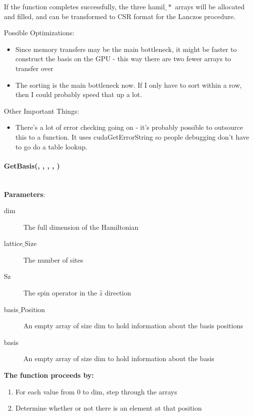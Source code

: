 \documentclass{article}
\begin{document}
{If the function completes successfully, the three hamil$\_*$ arrays will be allocated and filled, and can be transformed to CSR format for the Lanczos procedure.
 
Possible Optimizations:
\begin{itemize}
\item{Since memory transfers may be the main bottleneck, it might be faster to construct the basis on the GPU - this way there are two fewer arrays to transfer over}
\item{The sorting is the main bottleneck now. If I only have to sort within a row, then I could probably speed that up a lot.}
\end{itemize}

Other Important Things:
\begin{itemize}
\item{ There's a lot of error checking going on - it's probably possible to outsource this to a function. It uses cudaGetErrorString so people debugging don't have to go do a table lookup.}
\end{itemize} 

\paragraph{\host \void GetBasis(\int , \int , \int , \long [], \long []) \\ \\}
\noindent\textbf{Parameters}:
\begin{description}
\item[\long dim] The full dimension of the Hamiltonian
\item[\int lattice$\_$Size] The number of sites
\item[\int Sz] The spin operator in the $\hat{z}$ direction
\item[\long basis$\_$Position] An empty array of size dim to hold information about the basis positions
\item[\long basis] An empty array of size dim to hold information about the basis
\end{description}

\noindent\textbf{The function proceeds by:}
\begin{enumerate}
\item{For each value from 0 to dim, step through the arrays}
\item{Determine whether or not there is an element at that position}
\end{enumerate}

}
\end{document}
